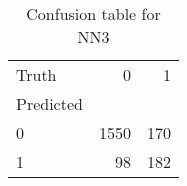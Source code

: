 \begin{table}[h!]
\caption{Confusion table for NN3}
\label{tab:NN3}
\begin{tabular}{lrr}
\toprule
Truth & 0 & 1 \\
Predicted &  &  \\
\midrule
0 & 1550 & 170 \\
1 & 98 & 182 \\
\bottomrule
\end{tabular}
\end{table}
